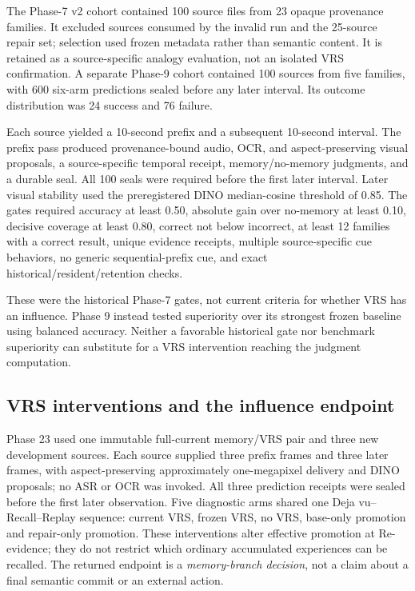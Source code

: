 \documentclass[11pt]{article}
\begin{document}
The Phase-7 v2 cohort contained 100 source files from 23 opaque provenance families. It excluded sources consumed by the invalid run and the 25-source repair set; selection used frozen metadata rather than semantic content. It is retained as a source-specific analogy evaluation, not an isolated VRS confirmation. A separate Phase-9 cohort contained 100 sources from five families, with 600 six-arm predictions sealed before any later interval. Its outcome distribution was 24 success and 76 failure.

Each source yielded a 10-second prefix and a subsequent 10-second interval.  The prefix pass produced provenance-bound audio, OCR, and aspect-preserving visual proposals, a source-specific temporal receipt, memory/no-memory judgments, and a durable seal.  All 100 seals were required before the first later interval.  Later visual stability used the preregistered DINO median-cosine threshold of 0.85.  The gates required accuracy at least 0.50, absolute gain over no-memory at least 0.10, decisive coverage at least 0.80, correct not below incorrect, at least 12 families with a correct result, unique evidence receipts, multiple source-specific cue behaviors, no generic sequential-prefix cue, and exact historical/resident/retention checks.

These were the historical Phase-7 gates, not current criteria for whether VRS has an influence. Phase 9 instead tested superiority over its strongest frozen baseline using balanced accuracy. Neither a favorable historical gate nor benchmark superiority can substitute for a VRS intervention reaching the judgment computation.

\subsection{VRS interventions and the influence endpoint}
\label{sec:influence}

Phase 23 used one immutable full-current memory/VRS pair and three new development sources. Each source supplied three prefix frames and three later frames, with aspect-preserving approximately one-megapixel delivery and DINO proposals; no ASR or OCR was invoked. All three prediction receipts were sealed before the first later observation. Five diagnostic arms shared one Deja vu--Recall--Replay sequence: current VRS, frozen VRS, no VRS, base-only promotion and repair-only promotion. These interventions alter effective promotion at Re-evidence; they do not restrict which ordinary accumulated experiences can be recalled. The returned endpoint is a \emph{memory-branch decision}, not a claim about a final semantic commit or an external action.
\end{document}

